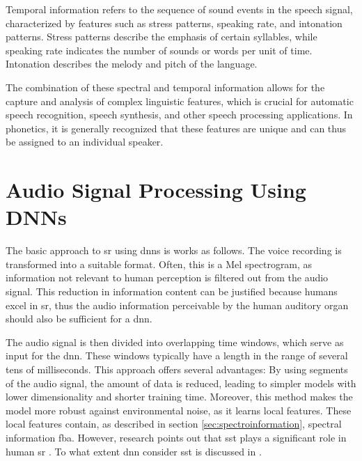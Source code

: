 Temporal information refers to the sequence of sound events in the speech signal, characterized by features such as stress patterns, speaking rate, and intonation patterns. Stress patterns describe the emphasis of certain syllables, while speaking rate indicates the number of sounds or words per unit of time. Intonation describes the melody and pitch of the language.

The combination of these spectral and temporal information allows for the capture and analysis of complex linguistic features, which is crucial for automatic speech recognition, speech synthesis, and other speech processing applications. In phonetics, it is generally recognized that these features are unique and can thus be assigned to an individual speaker.


\section{Audio Signal Processing Using DNNs}

The basic approach to \gls{sr} using \glspl{dnn} is works as follows.
The voice recording is transformed into a suitable format. Often, this is a Mel spectrogram, as information not relevant to human perception is filtered out from the audio signal. This reduction in information content can be justified because humans excel in \gls{sr}, thus the audio information perceivable by the human auditory organ should also be sufficient for a \gls{dnn}.


The audio signal is then divided into overlapping time windows, which serve as input for the \gls{dnn}. These windows typically have a length in the range of several tens of milliseconds. This approach offers several advantages: By using segments of the audio signal, the amount of data is reduced, leading to simpler models with lower dimensionality and shorter training time. Moreover, this method makes the model more robust against environmental noise, as it learns local features. These local features contain, as described in section \ref{sec:spectroinformation}, spectral information \gls{fba}. However, research points out that \gls{sst} plays a significant role in human \gls{sr} \cite{stadelmann2009unfolding}. To what extent \gls{dnn} consider \gls{sst} is discussed in \cite{neururer2023deep}.

